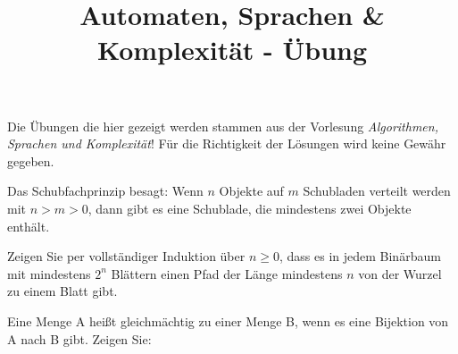 \documentclass[10pt, a4paper]{exam}
\title{Automaten, Sprachen \& Komplexität - Übung}
\author{}
\date{}
\begin{document}
\begin{myboxii}[Disclaimer]
    Die Übungen die hier gezeigt werden stammen aus der Vorlesung \textit{Algorithmen, Sprachen und Komplexität}! Für die Richtigkeit der Lösungen wird keine Gewähr gegeben.
\end{myboxii}

\begin{questions}
    \question Das Schubfachprinzip besagt: Wenn $n$ Objekte auf $m$ Schubladen verteilt werden mit $n > m > 0$, dann gibt es eine Schublade, die mindestens zwei Objekte enthält.

    \question Zeigen Sie per vollständiger Induktion über $n\geq 0$, dass es in jedem Binärbaum mit mindestens $2^n$ Blättern einen Pfad der Länge mindestens $n$ von der Wurzel zu einem Blatt gibt.
    \begin{solution}
    \end{solution}

    \question Eine Menge A heißt gleichmächtig zu einer Menge B, wenn es eine Bijektion von A nach B gibt. Zeigen Sie:
\end{questions}
\end{document}
